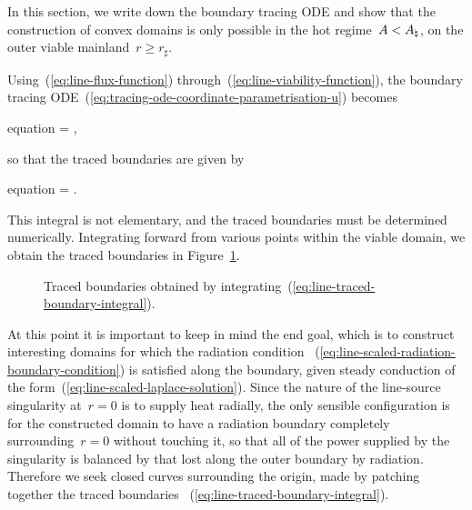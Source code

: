 In this section, we write down the boundary tracing ODE
and show that the construction of convex domains
is only possible in the hot regime~$A < A_\natural$,
on the outer viable mainland~$r \ge r_\sharp$.

Using~(\ref{eq:line-flux-function})
through~(\ref{eq:line-viability-function}),
the boundary tracing ODE~(\ref{eq:tracing-ode-coordinate-parametrisation-u})
becomes
\begin{important}{equation}
   = \mp {},
  \label{eq:line-tracing-ode-coordinate-parametrisation-r}
\end{important}
so that the traced boundaries are given by
\begin{important}{equation}
  \phi = \mp \int {}.
  \label{eq:line-traced-boundary-integral}
\end{important}
This integral is not elementary,
and the traced boundaries must be determined numerically.
Integrating forward from various points within the viable domain,
we obtain the traced boundaries in Figure~\ref{fig:line-traced-boundaries}.

\begin{figure}
  \newcommand*{\subfigurewidth}{0.325\textwidth}
  \centering
  \begin{subfigure}{\subfigurewidth}
  \end{subfigure}
  \hfill
  \begin{subfigure}{\subfigurewidth}
  \end{subfigure}
  \hfill
  \begin{subfigure}{\subfigurewidth}
  \end{subfigure}
  \caption{
    Traced boundaries
    obtained by integrating~(\ref{eq:line-traced-boundary-integral}).
  }
  \label{fig:line-traced-boundaries}
\end{figure}

At this point it is important to keep in mind the end goal,
which is to construct interesting domains
for which the radiation condition~%
  (\ref{eq:line-scaled-radiation-boundary-condition})
is satisfied along the boundary,
given steady conduction of the form~(\ref{eq:line-scaled-laplace-solution}).
Since the nature of the line-source singularity at~$r = 0$
is to supply heat radially,
the only sensible configuration is for the constructed domain to
have a radiation boundary
completely surrounding~$r = 0$ without touching it,
so that all of the power supplied by the singularity is balanced
by that lost along the outer boundary by radiation.
Therefore we seek closed curves surrounding the origin,
made by patching together the traced boundaries~%
  (\ref{eq:line-traced-boundary-integral}).

